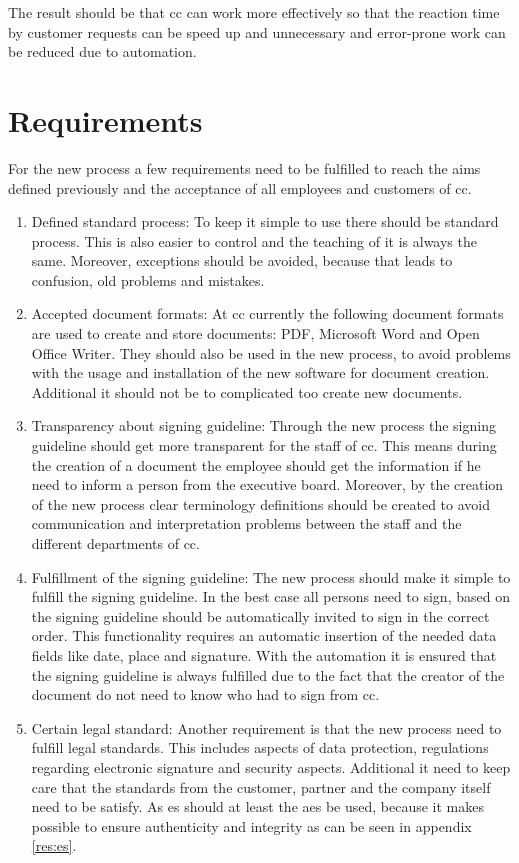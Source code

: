 The result should be that \gls{cc} can work more effectively so that the reaction time by customer requests can be speed up and unnecessary and error-prone work can be reduced due to automation.

\section{Requirements}
For the new process a few requirements need to be fulfilled to reach the aims defined previously and the acceptance of all employees and customers of \gls{cc}.
\begin{enumerate}
	\item Defined standard process: \newline
	To keep it simple to use there should be standard process. This is also easier to control and the teaching of it is always the same. Moreover, exceptions should be avoided, because that leads to confusion, old problems and mistakes.
	\item Accepted document formats: \newline
	At \gls{cc} currently the following document formats are used to create and store documents: \gls{PDF}, Microsoft Word and Open Office Writer. They should also be used in the new process, to avoid problems with the usage and installation of the new software for document creation. Additional it should not be to complicated too create new documents.
	\item Transparency about signing guideline: \newline
	Through the new process the signing guideline should get more transparent for the staff of \gls{cc}. This means during the creation of a document the employee should get the information if he need to inform a person from the executive board. Moreover, by the creation of the new process clear terminology definitions should be created to avoid communication and interpretation problems between the staff and the different departments of \gls{cc}.
	\item Fulfillment of the signing guideline:\newline
	The new process should make it simple to fulfill the signing guideline. In the best case all persons need to sign, based on the signing guideline should be automatically invited to sign in the correct order. This functionality requires an automatic insertion of the needed data fields like date, place and signature. With the automation it is ensured that the signing guideline is always fulfilled due to the fact that the creator of the document do not need to know who had to sign from \gls{cc}.
	\item Certain legal standard: \newline
	Another requirement is that the new process need to fulfill legal standards. This includes aspects of data protection, regulations regarding electronic signature and security aspects. Additional it need to keep care that the standards from the customer, partner and the company itself need to be satisfy. \newline
	As \gls{es} should at least the \gls{aes} be used, because it makes possible to ensure authenticity and integrity as can be seen in appendix \ref{res:es}. 
\end{enumerate}
